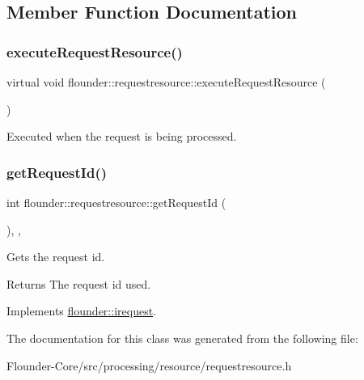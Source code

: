 \subsection{Member Function Documentation}
\mbox{\label{classflounder_1_1requestresource_a041468425259aa834e7b969ae3f75d5a}} 
\subsubsection{\texorpdfstring{execute\+Request\+Resource()}{executeRequestResource()}}
{\footnotesize\ttfamily virtual void flounder\+::requestresource\+::execute\+Request\+Resource (\begin{DoxyParamCaption}{ }\end{DoxyParamCaption})\hspace{0.3cm}{\ttfamily [pure virtual]}}



Executed when the request is being processed. 

\mbox{\label{classflounder_1_1requestresource_a4c46533325ddc35a1b89e4af418ea77e}} 
\subsubsection{\texorpdfstring{get\+Request\+Id()}{getRequestId()}}
{\footnotesize\ttfamily int flounder\+::requestresource\+::get\+Request\+Id (\begin{DoxyParamCaption}{ }\end{DoxyParamCaption})\hspace{0.3cm}{\ttfamily [inline]}, {\ttfamily [override]}, {\ttfamily [virtual]}}



Gets the request id. 

\begin{DoxyReturn}{Returns}
The request id used. 
\end{DoxyReturn}


Implements \hyperlink{classflounder_1_1irequest_a69e6b820c6635486e488e6aa18b11730}{flounder\+::irequest}.



The documentation for this class was generated from the following file\+:\begin{DoxyCompactItemize}
\item 
Flounder-\/\+Core/src/processing/resource/requestresource.\+h\end{DoxyCompactItemize}
